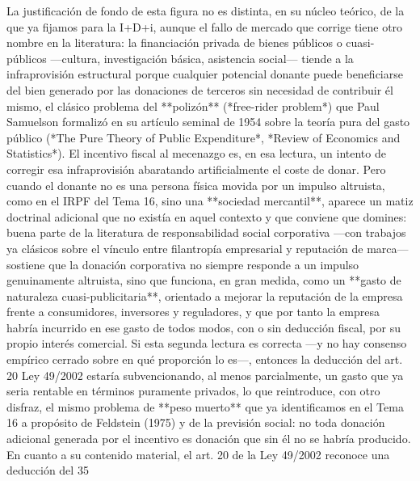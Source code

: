 \documentclass[10pt,a4paper]{article}
\begin{document}
La justificación de fondo de esta figura no es distinta, en su núcleo teórico, de la que ya fijamos para la I+D+i, aunque el fallo de mercado que corrige tiene otro nombre en la literatura: la financiación privada de bienes públicos o cuasi-públicos —cultura, investigación básica, asistencia social— tiende a la infraprovisión estructural porque cualquier potencial donante puede beneficiarse del bien generado por las donaciones de terceros sin necesidad de contribuir él mismo, el clásico problema del **polizón** (*free-rider problem*) que Paul Samuelson formalizó en su artículo seminal de 1954 sobre la teoría pura del gasto público (*The Pure Theory of Public Expenditure*, *Review of Economics and Statistics*). El incentivo fiscal al mecenazgo es, en esa lectura, un intento de corregir esa infraprovisión abaratando artificialmente el coste de donar. Pero cuando el donante no es una persona física movida por un impulso altruista, como en el IRPF del Tema 16, sino una **sociedad mercantil**, aparece un matiz doctrinal adicional que no existía en aquel contexto y que conviene que domines: buena parte de la literatura de responsabilidad social corporativa —con trabajos ya clásicos sobre el vínculo entre filantropía empresarial y reputación de marca— sostiene que la donación corporativa no siempre responde a un impulso genuinamente altruista, sino que funciona, en gran medida, como un **gasto de naturaleza cuasi-publicitaria**, orientado a mejorar la reputación de la empresa frente a consumidores, inversores y reguladores, y que por tanto la empresa habría incurrido en ese gasto de todos modos, con o sin deducción fiscal, por su propio interés comercial. Si esta segunda lectura es correcta —y no hay consenso empírico cerrado sobre en qué proporción lo es—, entonces la deducción del art. 20 Ley 49/2002 estaría subvencionando, al menos parcialmente, un gasto que ya seria rentable en términos puramente privados, lo que reintroduce, con otro disfraz, el mismo problema de **peso muerto** que ya identificamos en el Tema 16 a propósito de Feldstein (1975) y de la previsión social: no toda donación adicional generada por el incentivo es donación que sin él no se habría producido. En cuanto a su contenido material, el art. 20 de la Ley 49/2002 reconoce una deducción del 35%
\end{document}
